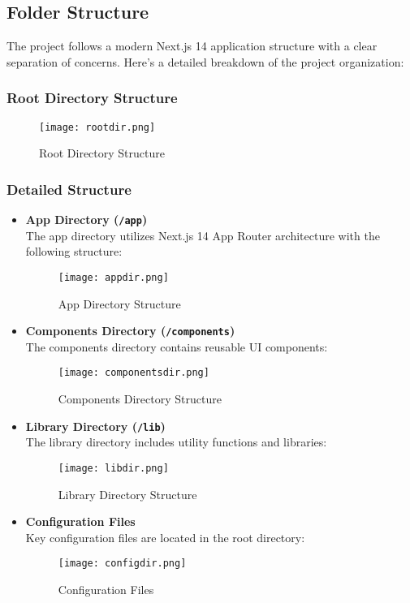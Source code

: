 \subsection{Folder Structure}
The project follows a modern Next.js 14 application structure\cite{nextjs_project_structure} with a clear separation of concerns. Here's a detailed breakdown of the project organization:

\subsubsection{Root Directory Structure}

\begin{figure}[H]
	\centering	\texttt{[image: rootdir.png]}
    \caption{Root Directory Structure}
    \end{figure}


\subsubsection{Detailed Structure}

\begin{itemize}
    \item \textbf{App Directory (\texttt{/app})} \\
    The app directory utilizes Next.js 14 App Router architecture with the following structure: 
    \begin{figure}[H]
        \centering
        \texttt{[image: appdir.png]}
        \caption{App Directory Structure}
    \end{figure}

    \item \textbf{Components Directory (\texttt{/components})} \\
    The components directory contains reusable UI components:
    \begin{figure}[H]
        \centering
        \texttt{[image: componentsdir.png]}
        \caption{Components Directory Structure}
    \end{figure}

    \item \textbf{Library Directory (\texttt{/lib})} \\
    The library directory includes utility functions and libraries:
    \begin{figure}[H]
        \centering
        \texttt{[image: libdir.png]}
        \caption{Library Directory Structure}
    \end{figure}

    \item \textbf{Configuration Files} \\
    Key configuration files are located in the root directory:
    \begin{figure}[H]
        \centering
        \texttt{[image: configdir.png]}
        \caption{Configuration Files}
    \end{figure}
\end{itemize}


